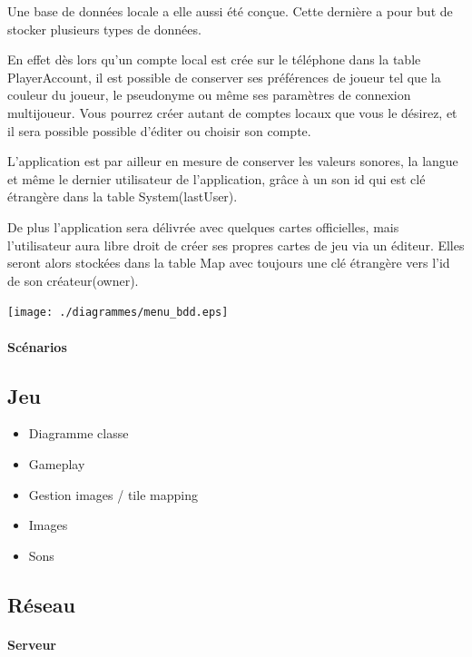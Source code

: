 \documentclass[a4paper,11pt]{report}
\begin{document}
				Une base de données locale a elle aussi été conçue. Cette dernière a pour
				but de stocker plusieurs types de données.
				
				En effet dès lors qu'un compte local est crée sur le téléphone dans la
				table PlayerAccount, il est possible de conserver ses préférences de joueur
				tel que la couleur du joueur, le pseudonyme ou même ses paramètres de connexion multijoueur. 
				Vous pourrez créer autant de comptes locaux que vous le désirez, et il
				sera possible possible d'éditer ou choisir son compte.
				
				L'application est par ailleur en mesure de conserver
				les valeurs sonores, la langue et même le dernier utilisateur de
				l'application, grâce à un son id qui est clé étrangère dans la table System(lastUser).
				
				De plus l'application sera délivrée avec quelques cartes officielles, mais
				l'utilisateur aura libre droit de créer ses propres cartes de jeu via un
				éditeur. Elles seront alors stockées dans la table Map avec toujours une
				clé étrangère vers l'id de son créateur(owner). \\
				
				\begin{center}
				\texttt{[image: ./diagrammes/menu\_bdd.eps]}
				\end{center}
				
				
				\paragraph{Scénarios}
			
		\subsection{Jeu}
			\begin{itemize}
				\item{Diagramme classe}
				\item{Gameplay}
				\item{Gestion images / tile mapping}
				\item{Images}
				\item{Sons}
			\end{itemize}
			
		\subsection{Réseau}
			\paragraph{Serveur\\}
			
\end{document}
